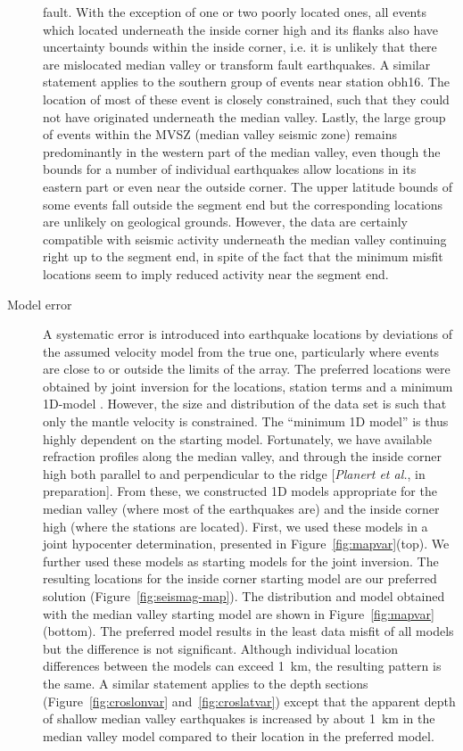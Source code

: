 \documentclass[jgr]{agu2001}
\newlength{\tw}
\begin{document}
\begin{article}
\begin{description}
fault.  With the exception of one or two poorly located ones, all
events which located underneath the inside corner high and its flanks
also have uncertainty bounds within the inside corner, i.e. it is unlikely
that there are mislocated median valley or transform fault
earthquakes.  A similar statement applies to the southern group of
events near station obh16.  The location of most of these event is
closely constrained, such that they could not have originated underneath
the median valley.   Lastly, the large group of events within the MVSZ
(median valley seismic zone) remains predominantly in the western part of the median
valley, even though the bounds for a number of individual earthquakes
allow locations in its eastern part or even near the outside corner.
The upper latitude bounds of
some events fall outside the segment end but the corresponding locations are
unlikely on geological grounds.  However, the data are certainly
compatible with seismic activity underneath the
median valley continuing right up to the segment end, in spite of the
fact that the minimum misfit locations seem to imply reduced activity
near the segment end. 

\item[Model error]
A systematic error is introduced into earthquake locations by
deviations of the assumed velocity model from the true one, particularly where
events are close to or outside the limits of the array.  The preferred
locations were obtained by joint inversion for the locations,
station terms and a minimum 1D-model \citep[using
VELEST,][]{kissling94}. However, the size and distribution of the data
set is such that only the mantle velocity is constrained.
The ``minimum 1D model'' is thus highly dependent on the starting
model.  Fortunately, we have available refraction profiles along the median
valley, and through the inside corner high both parallel to and
perpendicular to the ridge [{\it Planert et al.},
in preparation].  From these, we constructed 1D models appropriate for
the median valley (where most of the earthquakes are) and the inside
corner high (where the stations are located).  First, we used these
models in a joint hypocenter determination, presented in Figure~\ref{fig:mapvar}(top).
We further used these
models as starting models for the joint inversion. The resulting
locations for the inside corner starting model are our preferred
solution (Figure~\ref{fig:seismag-map}). The distribution and model obtained with the median valley
starting model are shown in Figure~\ref{fig:mapvar}(bottom).  The
preferred model results in the least data misfit of all models but the
difference is not significant.  Although individual location
differences between the models can exceed 1~km, the resulting pattern
is the same.  A similar statement applies to the depth sections
(Figure~\ref{fig:croslonvar} and~\ref{fig:croslatvar}) except that the
apparent depth of shallow median valley earthquakes is 
increased by about 1~km in the median valley model compared to their
location in the preferred model.


\end{description}
\end{article}
\end{document}
